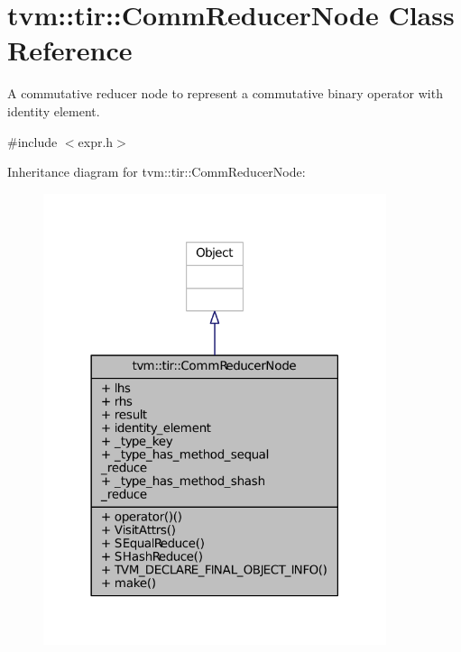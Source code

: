 \hypertarget{classtvm_1_1tir_1_1CommReducerNode}{}\section{tvm\+:\+:tir\+:\+:Comm\+Reducer\+Node Class Reference}
\label{classtvm_1_1tir_1_1CommReducerNode}


A commutative reducer node to represent a commutative binary operator with identity element.  




{\ttfamily \#include $<$expr.\+h$>$}



Inheritance diagram for tvm\+:\+:tir\+:\+:Comm\+Reducer\+Node\+:
\nopagebreak
\begin{figure}[H]
\begin{center}
\leavevmode
\includegraphics[width=285pt]{classtvm_1_1tir_1_1CommReducerNode__inherit__graph}
\end{center}
\end{figure}


